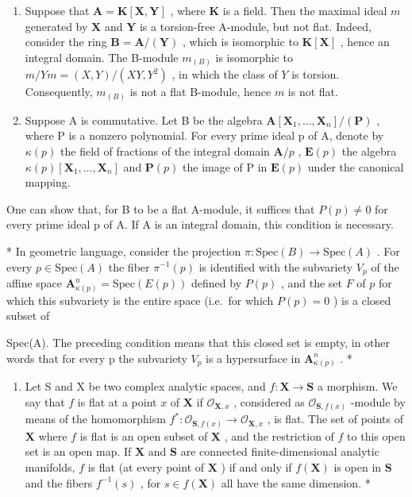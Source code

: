 \begin{enumerate}
\item
  Suppose that \(\mathbf{A} = \mathbf{K}[\mathbf{X}, \mathbf{Y}]\) , where \(\mathbf{K}\) is a field. Then the maximal ideal \(m\) generated by \(\mathbf{X}\) and \(\mathbf{Y}\) is a torsion-free A-module, but not flat. Indeed, consider the ring \(\mathbf{B} = \mathbf{A}/(\mathbf{Y})\) , which is isomorphic to \(\mathbf{K}[\mathbf{X}]\) , hence an integral domain. The B-module \(m_{(B)}\) is isomorphic to \(m/Ym = (X, Y)/(XY, Y^2)\) , in which the class of \(Y\) is torsion. Consequently, \(m_{(B)}\) is not a flat B-module, hence \(m\) is not flat.
\item
  Suppose A is commutative. Let B be the algebra \(\mathbf{A}[\mathbf{X}_1, \ldots, \mathbf{X}_n] / (\mathbf{P})\) , where P is a nonzero polynomial. For every prime ideal p of A, denote by \(\kappa(p)\) the field of fractions of the integral domain \(\mathbf{A} / p\) , \(\mathbf{E}(p)\) the algebra \(\kappa(p) [\mathbf{X}_1, \ldots, \mathbf{X}_n]\) and \(\mathbf{P}(p)\) the image of P in \(\mathbf{E}(p)\) under the canonical mapping.
\end{enumerate}

One can show that, for B to be a flat A-module, it suffices that \(P(p) \neq 0\) for every prime ideal p of A. If A is an integral domain, this condition is necessary.

* In geometric language, consider the projection \(\pi: \text{Spec}(B) \to \text{Spec}(A)\) . For every \(p \in \text{Spec}(A)\) the fiber \(\pi^{-1}(p)\) is identified with the subvariety \(V_p\) of the affine space \(\mathbf{A}_{\kappa(p)}^n = \text{Spec}(E(p))\) defined by \(P(p)\) , and the set \(F\) of \(p\) for which this subvariety is the entire space (i.e.~for which \(P(p) = 0\) ) is a closed subset of

Spec(A). The preceding condition means that this closed set is empty, in other words that for every p the subvariety \(V_{p}\) is a hypersurface in \(\mathbf{A}_{\kappa(p)}^{n}\) . *

\begin{enumerate}
\def\labelenumi{\arabic{enumi})}
\setcounter{enumi}{10}
\tightlist
\item
  Let S and X be two complex analytic spaces, and \(f: \mathbf{X} \to \mathbf{S}\) a morphism. We say that \(f\) is flat at a point \(x\) of \(\mathbf{X}\) if \(\mathcal{O}_{\mathbf{X},x}\) , considered as \(\mathcal{O}_{\mathbf{S},f(x)}\) -module by means of the homomorphism \(f^{*}: \mathcal{O}_{\mathbf{S},f(x)} \to \mathcal{O}_{\mathbf{X},x}\) , is flat. The set of points of \(\mathbf{X}\) where \(f\) is flat is an open subset of \(\mathbf{X}\) , and the restriction of \(f\) to this open set is an open map. If \(\mathbf{X}\) and \(\mathbf{S}\) are connected finite-dimensional analytic manifolds, \(f\) is flat (at every point of \(\mathbf{X}\) ) if and only if \(f(\mathbf{X})\) is open in \(\mathbf{S}\) and the fibers \(f^{-1}(s)\) , for \(s \in f(\mathbf{X})\) all have the same dimension. *
\end{enumerate}

